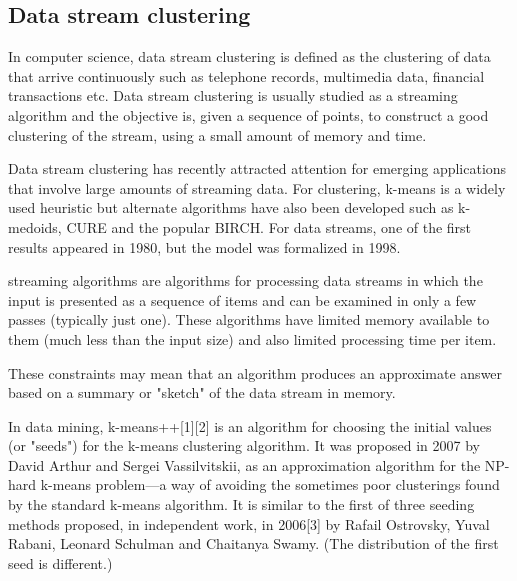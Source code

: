 \subsection*{Data stream clustering}
In computer science, data stream clustering is defined as the clustering of data that arrive continuously such as telephone records, multimedia data, financial transactions etc. Data stream clustering is usually studied as a streaming algorithm and the objective is, given a sequence of points, to construct a good clustering of the stream, using a small amount of memory and time.

Data stream clustering has recently attracted attention for emerging applications that involve large amounts of streaming data. For clustering, k-means is a widely used heuristic but alternate algorithms have also been developed such as k-medoids, CURE and the popular BIRCH.
For data streams, one of the first results appeared in 1980, but the model was formalized in 1998.

streaming algorithms are algorithms for processing data streams in which the input is presented as a sequence of items and can be examined in only a few passes (typically just one). These algorithms have limited memory available to them (much less than the input size) and also limited processing time per item.

These constraints may mean that an algorithm produces an approximate answer based on a summary or "sketch" of the data stream in memory.


In data mining, k-means++[1][2] is an algorithm for choosing the initial values (or "seeds") for the k-means clustering algorithm. It was proposed in 2007 by David Arthur and Sergei Vassilvitskii, as an approximation algorithm for the NP-hard k-means problem—a way of avoiding the sometimes poor clusterings found by the standard k-means algorithm. It is similar to the first of three seeding methods proposed, in independent work, in 2006[3] by Rafail Ostrovsky, Yuval Rabani, Leonard Schulman and Chaitanya Swamy. (The distribution of the first seed is different.)
